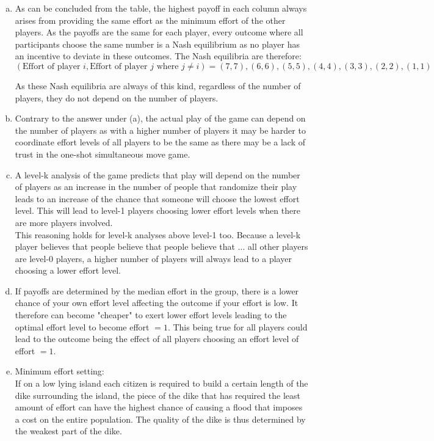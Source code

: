 \documentclass[a4paper]{article}
\begin{document}
\begin{enumerate}[(a)]
\item
As can be concluded from the table, the highest payoff in each column always arises from providing the same effort as the minimum effort of the other players. As the payoffs are the same for each player, every outcome where all participants choose the same number is a Nash equilibrium as no player has an incentive to deviate in these outcomes. The Nash equilibria are therefore: $$(\text{Effort of player }i, \text{Effort of player }j\text{ where }j\ne i)=(7,7),(6,6),(5,5),(4,4),(3,3),(2,2),(1,1)$$

As these Nash equilibria are always of this kind, regardless of the number of players, they do not depend on the number of players. 

\item
Contrary to the answer under (a), the actual play of the game can depend on the number of players as with a higher number of players it may be harder to coordinate effort levels of all players to be the same as there may be a lack of trust in the one-shot simultaneous move game. 

\item
A level-k analysis of the game predicts that play will depend on the number of players as an increase in the number of people that randomize their play leads to an increase of the chance that someone will choose the lowest effort level. This will lead to level-1 players choosing lower effort levels when there are more players involved. \\This reasoning holds for level-k analyses above level-1 too. Because a level-k player believes that people believe that people believe that ... all other players are level-0 players, a higher number of players will always lead to a player choosing a lower effort level. 

\item
If payoffs are determined by the median effort in the group, there is a lower chance of your own effort level affecting the outcome if your effort is low. It therefore can become "cheaper" to exert lower effort levels leading to the optimal effort level to become effort $=1$. This being true for all players could lead to the outcome being the effect of all players choosing an effort level of effort $=1$.

\item
Minimum effort setting: \\
If on a low lying island each citizen is required to build a certain length of the dike surrounding the island, the piece of the dike that has required the least amount of effort can have the highest chance of causing a flood that imposes a cost on the entire population. The quality of the dike is thus determined by the weakest part of the dike. 


\end{enumerate}
\end{document}
